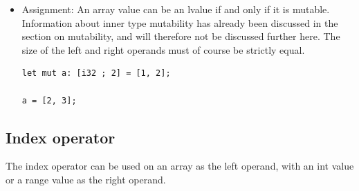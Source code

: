 \begin{itemize}
\item Assignment: An array value can be an lvalue if and only if it is mutable.
  Information about inner type mutability has already been discussed in the
  section on mutability, and will therefore not be discussed further here. The
  size of the left and right operands must of course be strictly equal.

  \begin{lstlisting}[style=coloredverbatim]
let mut a: [i32 ; 2] = [1, 2];

a = [2, 3];
  \end{lstlisting}

\end{itemize}

\subsection {Index operator}

The index operator can be used on an array as the left operand, with an int
value or a range value as the right operand.

